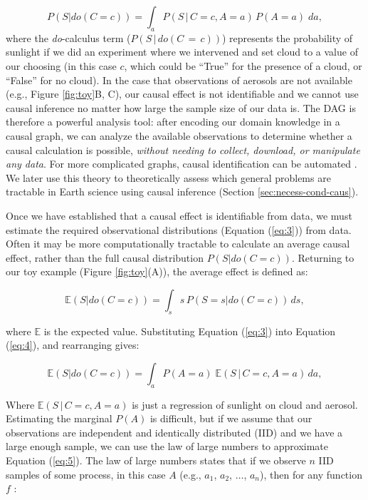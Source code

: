 \documentclass[12pt]{article}
\begin{document}
\begin{equation} P(S | do(C = c)) = \int_{a} P(S \, | \, C = c, A=a)
  \, P(A=a) \; da,
  \label{eq:3}
\end{equation} where the \textit{do}-calculus \citep{pearl2009} term
($P(S \, | \, do(C\, = \,c))$) represents the probability of sunlight
if we did an experiment where we intervened and set cloud to a value
of our choosing (in this case $c$, which could be ``True'' for the
presence of a cloud, or ``False'' for no cloud). In the case that
observations of aerosols are not available (e.g., Figure
\ref{fig:toy}B, C), our causal effect is not identifiable and we
cannot use causal inference no matter how large the sample size of our
data is. The DAG is therefore a powerful analysis tool: after encoding
our domain knowledge in a causal graph, we can analyze the available
observations to determine whether a causal calculation is possible,
\textit{without needing to collect, download, or manipulate any
  data}. For more complicated graphs, causal identification can be
automated \citep[][ \url{http://www.dagitty.net/}]{shpitser2006,
  textor2017}. We later use this theory to theoretically assess which
general problems are tractable in Earth science using causal inference
(Section \ref{sec:necess-cond-caus}).

Once we have established that a causal effect is identifiable from
data, we must estimate the required observational distributions
(Equation (\ref{eq:3})) from data. Often it may be more
computationally tractable to calculate an average causal effect,
rather than the full causal distribution $P(S | do(C=c))$. Returning
to our toy example (Figure \ref{fig:toy}(A)), the average effect is
defined as:

\begin{equation} \mathbb{E}(S | do(C = c)) = \int_{s} s \, P(S = s |
  do(C=c)) \, ds,
  \label{eq:4}
\end{equation}

where $\mathbb{E}$ is the expected value. Substituting Equation
(\ref{eq:3}) into Equation (\ref{eq:4}), and rearranging gives:

\begin{equation} \mathbb{E}(S | do(C = c)) = \int_{a} P(A=a) \;
  \mathbb{E}(S \, | \, C=c, A=a) \, d a,
  \label{eq:5}
\end{equation}

Where $\mathbb{E}(S \, | \, C=c, A=a)$ is just a regression of
sunlight on cloud and aerosol. Estimating the marginal $P(A)$ is
difficult, but if we assume that our observations are independent and
identically distributed (IID) and we have a large enough sample, we
can use the law of large numbers to approximate Equation
(\ref{eq:5}). The law of large numbers states that if we observe $n$
IID samples of some process, in this case $A$ (e.g., $a_1$, $a_2$,
$\ldots$, $a_n$), then for any function $f$ \citep{shalizi2013}:
\end{document}
